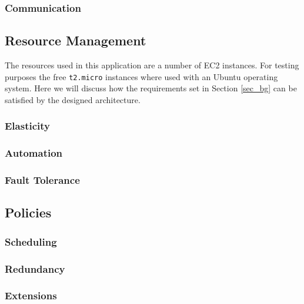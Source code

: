 \documentclass{acm_proc_article-sp}
\begin{document}
\subsubsection{Communication}

\subsection{Resource Management}
The resources used in this application are a number of EC2 instances.
For testing purposes the free \texttt{t2.micro} instances where used with an Ubuntu operating system.
Here we will discuss how the requirements set in Section \ref{sec_bg} can be satisfied by the designed architecture.

\subsubsection{Elasticity}

\subsubsection{Automation}

\subsubsection{Fault Tolerance}

\subsection{Policies}

\subsubsection{Scheduling}

\subsubsection{Redundancy}

\subsubsection{Extensions}
\end{document}

